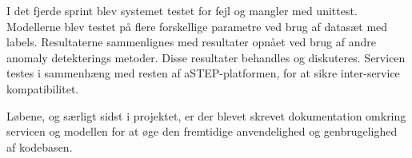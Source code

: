 I det fjerde sprint blev systemet testet for fejl og mangler med unittest. Modellerne blev testet på flere forskellige parametre ved brug af datasæt med labels. Resultaterne sammenlignes med resultater opnået ved brug af andre anomaly detekterings metoder. Disse resultater behandles og diskuteres. Servicen testes i sammenhæng med resten af aSTEP-platformen, for at sikre inter-service kompatibilitet.

Løbene, og særligt sidst i projektet, er der blevet skrevet dokumentation omkring servicen og modellen for at øge den fremtidige anvendelighed og genbrugelighed af kodebasen.

